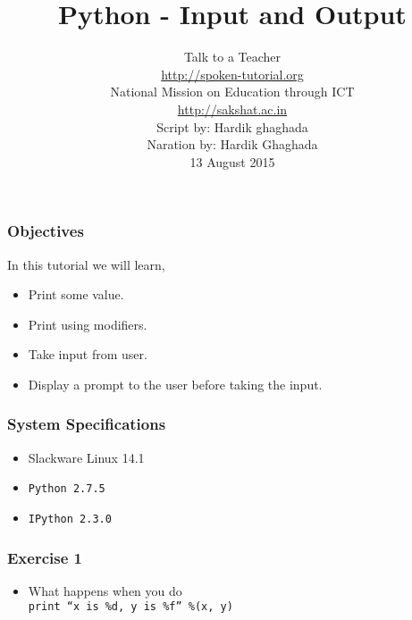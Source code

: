 \documentclass[17pt,compress]{beamer}
\author[FOSSEE]{}
\institute[IIT Bombay]{}
\date[]{}
\begin{document}
\sffamily \bfseries
\title
[Input and Output]
{Python - Input and Output}
\author
[FOSSEE, IIT - Bombay]
{\small Talk to a Teacher\\{\color{blue}\url{http://spoken-tutorial.org}}\\National Mission on Education
 through ICT\\{\color{blue}\url{http://sakshat.ac.in}} \\[0.5cm]{\tiny Script by: Hardik ghaghada \\ Naration by: Hardik Ghaghada \\ 13 August 2015}}

\begin{frame}
   \titlepage
\end{frame}
\begin{frame}
\frametitle{Objectives}
\label{sec-2}

  In this tutorial we will learn, \pause


\begin{itemize}
\item Print some value.\pause
\item Print using modifiers.\pause
\item Take input from user.\pause
\item Display a prompt to the user before taking the input.
\end{itemize}
   
\end{frame}
\begin{frame}
\frametitle{System Specifications}\pause
\begin{itemize}
\item Slackware Linux 14.1\pause
\item \texttt{Python 2.7.5} \pause
\item \texttt{IPython 2.3.0}
\end{itemize}
\end{frame}
\begin{frame}
\frametitle{Exercise 1}
\label{sec-3}


\begin{itemize}
\item What happens when you do\\
  \texttt{print ``x is \%d, y is \%f''  \%(x, y)}
\end{itemize}
\end{frame}
\end{document}
